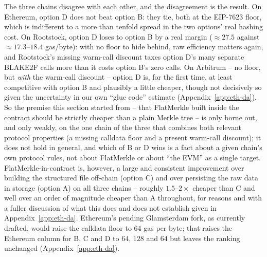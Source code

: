 The three chains disagree with each other, and the disagreement is the
result. On Ethereum, option D does not beat option B: they tie, both at
the EIP-7623 floor, which is indifferent to a more than tenfold spread in
the two options' real hashing cost. On Rootstock, option D loses to
option B by a real margin ($\approx\!27.5$ against
$\approx\!17.3$--$18.4$ gas/byte): with no floor to hide behind, raw
efficiency matters again, and Rootstock's missing warm-call discount
taxes option D's many separate BLAKE2F calls more than it costs option
B's zero calls. On Arbitrum -- no floor, but \emph{with} the warm-call
discount -- option D is, for the first time, at least competitive with
option B and plausibly a little cheaper, though not decisively so given
the uncertainty in our own ``glue code'' estimate (Appendix~\ref{app:eth-da}).
So the premise this section started from -- that FlatMerkle built inside
the contract should be strictly cheaper than a plain Merkle tree -- is
only borne out, and only weakly, on the one chain of the three that
combines both relevant protocol properties (a missing calldata floor and
a present warm-call discount); it does not hold in general, and which of
B or D wins is a fact about a given chain's own protocol rules, not about
FlatMerkle or about ``the EVM'' as a single target. FlatMerkle-in-contract
is, however, a large and consistent improvement over building the
structured file off-chain (option C) and over persisting the raw data in
storage (option A) on all three chains -- roughly $1.5$--$2\times$
cheaper than C and well over an order of magnitude cheaper than A
throughout, for reasons and with a fuller discussion of what this
does and does not establish given in Appendix~\ref{app:eth-da}.
Ethereum's pending Glamsterdam fork, as currently drafted, would raise the
calldata floor to $64$ gas per byte; that raises the Ethereum column for
B, C and D to $64$, $128$ and $64$ but leaves the ranking unchanged
(Appendix~\ref{app:eth-da}).
